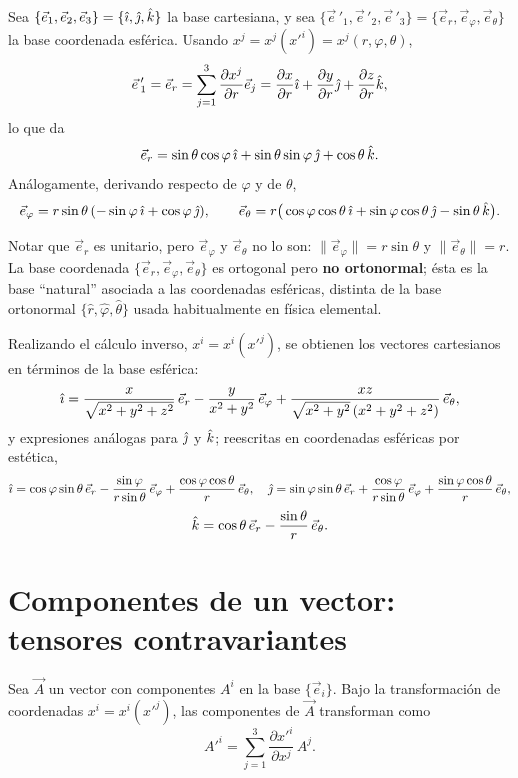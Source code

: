 \begin{ejemplo}
Sea $\{\vec e_1,\vec e_2,\vec e_3\} = \{\hat{\imath},\hat{\jmath},\hat{k}\}$ la base
cartesiana, y sea $\{\vec e\,'_1,\vec e\,'_2,\vec e\,'_3\} =
\{\vec e_r,\vec e_\varphi,\vec e_\theta\}$ la base coordenada esférica.
Usando $x^j=x^j(x'^i)=x^j(r,\varphi,\theta)$,
\[
\vec e\,'_1 = \vec e_r = \sum_{j=1}^3 \frac{\partial x^j}{\partial r}
\vec e_j = \frac{\partial x}{\partial r}\hat{\imath} + \frac{\partial y}{\partial
r}\hat{\jmath} + \frac{\partial z}{\partial r}\hat{k} ,
\]
lo que da
\[
\vec e_r = \sin\theta\cos\varphi\,\hat{\imath} + \sin\theta\sin\varphi\,\hat{\jmath} +
\cos\theta\,\hat{k} .
\]
Análogamente, derivando respecto de $\varphi$ y de $\theta$,
\[
\vec e_\varphi = r\sin\theta\,(-\sin\varphi\,\hat{\imath} + \cos\varphi\,\hat{\jmath}),
\qquad
\vec e_\theta = r\big(\cos\varphi\cos\theta\,\hat{\imath} +
\sin\varphi\cos\theta\,\hat{\jmath} - \sin\theta\,\hat{k}\big).
\]

\medskip
Notar que $\vec e_r$ es unitario, pero $\vec e_\varphi$ y $\vec e_\theta$
no lo son: $\|\vec e_\varphi\| = r\sin\theta$ y $\|\vec e_\theta\|=r$. La
base coordenada $\{\vec e_r,\vec e_\varphi,\vec e_\theta\}$ es ortogonal
pero \textbf{no ortonormal}; ésta es la base ``natural'' asociada a las
coordenadas esféricas, distinta de la base ortonormal
$\{\hat r,\hat\varphi,\hat\theta\}$ usada habitualmente en física
elemental.

\medskip
Realizando el cálculo inverso, $x^i=x^i(x'^j)$, se obtienen los vectores
cartesianos en términos de la base esférica:
\[
\hat{\imath} = \frac{x}{\sqrt{x^2+y^2+z^2}}\,\vec e_r - \frac{y}{x^2+y^2}\,
\vec e_\varphi + \frac{xz}{\sqrt{x^2+y^2}\,(x^2+y^2+z^2)}\, \vec e_\theta ,
\]
y expresiones análogas para $\hat{\jmath}$ y $\hat{k}$; reescritas en coordenadas
esféricas por estética,
\[
\hat{\imath} = \cos\varphi\sin\theta\,\vec e_r - \frac{\sin\varphi}{r\sin\theta}\,
\vec e_\varphi + \frac{\cos\varphi\cos\theta}{r}\,\vec e_\theta, \quad
\hat{\jmath} = \sin\varphi\sin\theta\,\vec e_r + \frac{\cos\varphi}{r\sin\theta}\,
\vec e_\varphi + \frac{\sin\varphi\cos\theta}{r}\,\vec e_\theta,
\]
\[
\hat{k} = \cos\theta\,\vec e_r - \frac{\sin\theta}{r}\,\vec e_\theta .
\]
\end{ejemplo}

\section{Componentes de un vector: tensores contravariantes}

\begin{proposicionc}
\label{prop:transf-componentes}
Sea $\vec A$ un vector con componentes $A^i$ en la base $\{\vec e_i\}$.
Bajo la transformación de coordenadas $x^i=x^i(x'^j)$, las componentes de
$\vec A$ transforman como
\[
A'^i = \sum_{j=1}^{3} \frac{\partial x'^i}{\partial x^j}\, A^j .
\]
\end{proposicionc}

